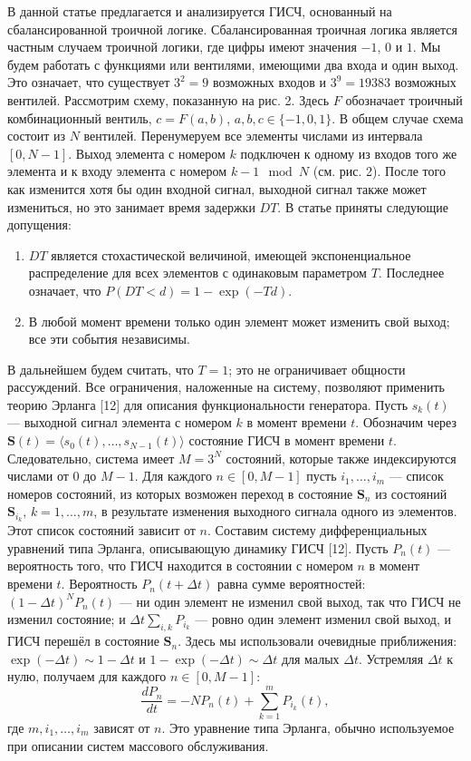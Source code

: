 \documentclass[a4paper,12pt]{article}
\begin{document}
В данной статье предлагается и анализируется ГИСЧ, основанный на сбалансированной троичной логике. Сбалансированная троичная логика является частным случаем троичной логики, где цифры имеют значения $-1$, $0$ и $1$. Мы будем работать с функциями или вентилями, имеющими два входа и один выход. Это означает, что существует $3^2 = 9$ возможных входов и $3^9 = 19383$ возможных вентилей. Рассмотрим схему, показанную на рис. 2. Здесь $F$ обозначает троичный комбинационный вентиль, $c = F(a,b)$, $a,b,c \in \{-1,0,1\}$. В общем случае схема состоит из $N$ вентилей. Перенумеруем все элементы числами из интервала $[0, N-1]$. Выход элемента с номером $k$ подключен к одному из входов того же элемента и к входу элемента с номером $k-1 \mod N$ (см. рис. 2). После того как изменится хотя бы один входной сигнал, выходной сигнал также может измениться, но это занимает время задержки $DT$. В статье приняты следующие допущения:
\begin{enumerate}
\item $DT$ является стохастической величиной, имеющей экспоненциальное распределение для всех элементов с одинаковым параметром $T$. Последнее означает, что $P(DT < d) = 1 - \exp(-Td)$.
\item В любой момент времени только один элемент может изменить свой выход; все эти события независимы.
\end{enumerate}

В дальнейшем будем считать, что $T = 1$; это не ограничивает общности рассуждений. Все ограничения, наложенные на систему, позволяют применить теорию Эрланга [12] для описания функциональности генератора. Пусть $s_k(t)$ — выходной сигнал элемента с номером $k$ в момент времени $t$. Обозначим через $\mathbf{S}(t) = \langle s_0(t), \ldots, s_{N-1}(t) \rangle$ состояние ГИСЧ в момент времени $t$. Следовательно, система имеет $M = 3^N$ состояний, которые также индексируются числами от $0$ до $M-1$. Для каждого $n \in [0, M-1]$ пусть $i_1, \ldots, i_m$ — список номеров состояний, из которых возможен переход в состояние $\mathbf{S}_n$ из состояний $\mathbf{S}_{i_k}$, $k=1,\ldots,m$, в результате изменения выходного сигнала одного из элементов. Этот список состояний зависит от $n$. Составим систему дифференциальных уравнений типа Эрланга, описывающую динамику ГИСЧ [12]. Пусть $P_n(t)$ — вероятность того, что ГИСЧ находится в состоянии с номером $n$ в момент времени $t$. Вероятность $P_n(t+\Delta t)$ равна сумме вероятностей: $(1 - \Delta t)^N P_n(t)$ — ни один элемент не изменил свой выход, так что ГИСЧ не изменил состояние; и $\Delta t \sum_{i,k} P_{i_k}$ — ровно один элемент изменил свой выход, и ГИСЧ перешёл в состояние $\mathbf{S}_n$. Здесь мы использовали очевидные приближения: $\exp(-\Delta t) \sim 1 - \Delta t$ и $1 - \exp(-\Delta t) \sim \Delta t$ для малых $\Delta t$. Устремляя $\Delta t$ к нулю, получаем для каждого $n \in [0, M-1]$:
\begin{equation}
\frac{dP_n}{dt} = -N P_n(t) + \sum_{k=1}^{m} P_{i_k}(t), \tag{1}
\end{equation}
где $m, i_1, \ldots, i_m$ зависят от $n$. Это уравнение типа Эрланга, обычно используемое при описании систем массового обслуживания.
\end{document}
